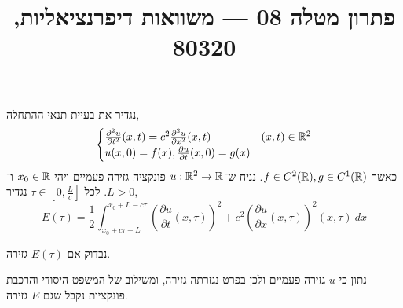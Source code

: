 
\title{פתרון מטלה 08 --- משוואות דיפרנציאליות, 80320}

\usepackage{pgfplots, tikz, pgffor}
\usetikzlibrary{math}
\pgfplotsset{compat=1.18}


\maketitle
\maketitleprint[blue]{}

\question{}
נגדיר את בעיית תנאי ההתחלה,
\[
	\begin{cases}
		\frac{\partial^2 u}{\partial t^2}(x, t) = c^2 \frac{\partial^2 u}{\partial x^2}(x, t) & (x, t) \in \mathbb{R}^2 \\
		u(x, 0) = f(x), \frac{\partial u}{\partial t}(x, 0) = g(x)
	\end{cases}
\]
כאשר $f \in C^2(\mathbb{R}), g \in C^1(\mathbb{R})$.
נניח ש־$u : \mathbb{R}^2 \to \mathbb{R}$ פונקציה גזירה פעמיים ויהי $x_0 \in \mathbb{R}$ ו־$L > 0$.
לכל $\tau \in [0, \frac{L}{c}]$ נגדיר,
\[
	E(\tau)
	= \frac{1}{2} \int_{x_0 + c \tau - L}^{x_0 + L - c \tau} {\left(\frac{\partial u}{\partial t}(x, \tau)\right)}^2 + c^2 {\left(\frac{\partial u}{\partial x}(x, \tau)\right)}^2 (x, \tau)\ dx
\]

\subquestion{}
נבדוק אם $E(\tau)$ גזירה.
\begin{solution}
	נתון כי $u$ גזירה פעמיים ולכן בפרט נגזרתה גזירה, ומשילוב של המשפט היסודי והרכבת פונקציות נקבל שגם $E$ גזירה.
\end{solution}

